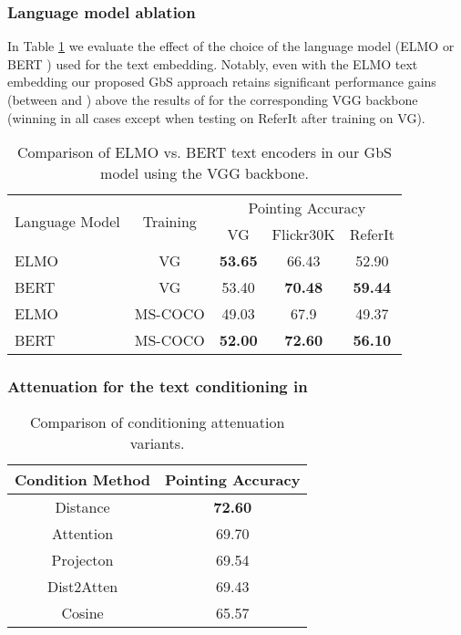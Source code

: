 \documentclass[10pt,twocolumn,letterpaper]{article}
\def\oursspace{{GbS }}
\newcommand\secvspace{\vspace{-0.0cm}}
\newcommand\figvspace{\vspace{-0.2cm}}
\begin{document}
\secvspace
\subsubsection{Language model ablation}\label{sec:abl_lang}
In Table \ref{tab:lang_model_supp} we evaluate the effect of the choice of the language model (ELMO \cite{peters2018deep} or BERT \cite{devlin2018bert}) used for the text embedding. 
Notably, even with the ELMO text embedding our proposed \oursspace approach retains significant performance gains (between  and ) above the results of \cite{akbari2019multi} for the corresponding VGG backbone (winning in all cases except when testing on ReferIt after training on VG).
\begin{table}[h]
\begin{center}
\begin{tabular}{ lcccc }
\toprule
 \multirow{2}{*}{Language Model} & \multirow{2}{*}{Training} & \multicolumn{3}{c}{ Pointing Accuracy}\\
   &  & VG & Flickr30K & ReferIt\\ 
 \midrule ELMO & VG & \textbf{53.65} & 66.43 & 52.90 \\
 BERT & VG & 53.40 & \textbf{70.48} & \textbf{59.44}\\
 \midrule
 ELMO & MS-COCO & 49.03 & 67.9 & 49.37 \\
 BERT & MS-COCO & \textbf{52.00} & \textbf{72.60} & \textbf{56.10} \\
\end{tabular}
\end{center}
\caption{Comparison of ELMO vs. BERT text encoders in our \oursspace model using the VGG backbone.
}
\figvspace
\label{tab:lang_model_supp}
\end{table}
 
\secvspace
\subsubsection{Attenuation for the text conditioning in }\label{sec:abl_cond}
\secvspace
\begin{table}
\begin{center}
\begin{tabular}{ c| c}
Condition Method & Pointing Accuracy\\
 \hline
 Distance & \textbf{72.60}\\
 Attention & 69.70  \\
 Projecton &  69.54\\
 Dist2Atten & 69.43 \\
 Cosine & 65.57 
\end{tabular}
\end{center}
\caption{Comparison of conditioning attenuation variants.}
\figvspace
\label{tab:cond_ablation}
\end{table}
\end{document}
